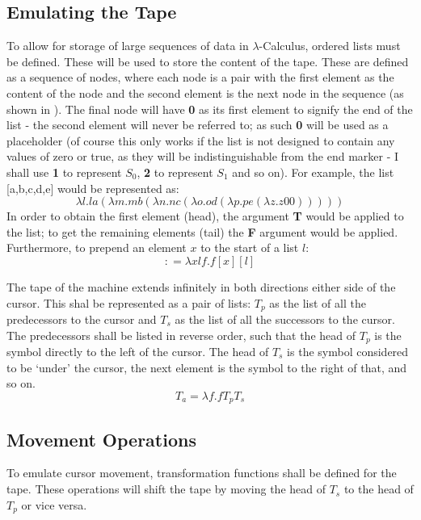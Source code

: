 \documentclass[Master.tex]{subfiles}
\begin{document}
\subsection{Emulating the Tape}\label{sec:LambdaUnivTape}
To allow for storage of large sequences of data in $\lambda$-Calculus, ordered lists must be defined. These will be used to store the content of the tape. These are defined as a sequence of nodes, where each node is a pair with the first element as the content of the node and the second element is the next node in the sequence (as shown in \cite{tromp2007binary}). The final node will have \textbf{0} as its first element to signify the end of the list - the second element will never be referred to; as such \textbf{0} will be used as a placeholder (of course this only works if the list is not designed to contain any values of zero or true, as they will be indistinguishable from the end marker - I shall use \textbf{1} to represent $S_0$, \textbf{2} to represent $S_1$ and so on). For example, the list [a,b,c,d,e] would be represented as:
\begin{equation*}
\lambda l.la(\lambda m.mb(\lambda n.nc(\lambda o.od(\lambda p.pe(\lambda z.z\bm{\mathrm{00}})))))
\end{equation*}
In order to obtain the first element (head), the argument \textbf{T} would be applied to the list; to get the remaining elements (tail) the \textbf{F} argument would be applied. 
Furthermore, to prepend an element $x$ to the start of a list $l$:
\begin{equation*}
\bm{\mathrm{:}} = \lambda xlf.f[x][l]
\end{equation*}
 
The tape of the machine extends infinitely in both directions either side of the cursor. This shal be represented as a pair of lists: $T_p$ as the list of all the predecessors to the cursor and $T_s$ as the list of all the successors to the cursor. The predecessors shall be listed in reverse order, such that the head of $T_p$ is the symbol directly to the left of the cursor. The head of $T_s$ is the symbol considered to be `under' the cursor, the next element is the symbol to the right of that, and so on.
\begin{equation*}
T_a = \lambda f.f T_p T_s
\end{equation*}

\subsection{Movement Operations}
To emulate cursor movement, transformation functions shall be defined for the tape. These operations will shift the tape by moving the head of $T_s$ to the head of $T_p$ or vice versa.
\end{document}
